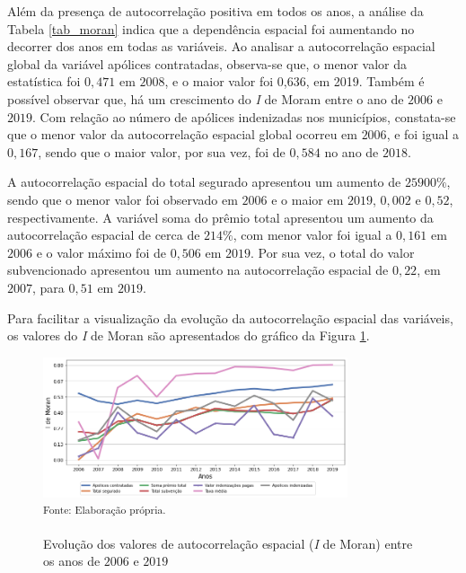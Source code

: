 Além da presença de autocorrelação positiva em todos os anos, a análise da Tabela \ref{tab_moran} indica que a dependência espacial foi aumentando no decorrer dos anos em todas as variáveis. Ao analisar a autocorrelação espacial global da variável apólices contratadas, observa-se que, o menor valor da estatística foi  $0,471$ em $2008$, e o maior valor foi 0,636, em 2019. Também é possível observar que, há um crescimento do \textit{I} de Moram entre o ano de $2006$ e $2019$. Com relação ao número de apólices indenizadas nos municípios, constata-se que o menor valor da autocorrelação espacial global ocorreu em $2006$, e foi igual a $0,167$, sendo que o maior valor, por sua vez, foi de $0,584$ no ano de $2018$. %


A autocorrelação espacial do total segurado apresentou um aumento de $25900\%$, sendo que o menor valor foi observado em $2006$ e o maior em $2019$, $0,002$ e $0,52$, respectivamente. A variável soma do prêmio total apresentou um aumento da autocorrelação espacial de cerca de $214\%$, com menor valor foi igual a $0,161$ em $2006$ e o valor máximo foi de $0,506$ em $2019$. Por sua vez, o total do valor subvencionado apresentou um aumento na autocorrelação espacial de $0,22$, em  $2007$, para $0,51$ em $2019$.

Para facilitar a visualização da evolução da autocorrelação espacial das variáveis, os valores do \textit{I} de Moran são apresentados do gráfico da Figura \ref{i_moran_anos}.

\begin{figure}[!htp]
	\centering
	\caption{Evolução dos valores de autocorrelação espacial (\textit{I} de Moran) entre os anos de $2006$ e $2019$}
	\includegraphics[width=0.8\textwidth]{figuras/i_de_moran.png}\\
	\small \textsuperscript {Fonte: Elaboração própria.}
    \label{i_moran_anos}
\end{figure}

